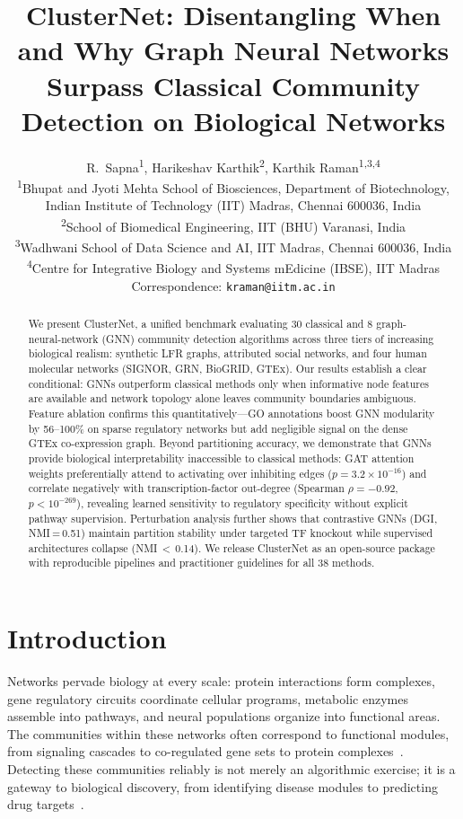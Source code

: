 \documentclass[11pt]{article}
\title{ClusterNet: Disentangling When and Why Graph Neural Networks\\
Surpass Classical Community Detection on Biological Networks}
\author{
  R.~Sapna\textsuperscript{1},
  Harikeshav Karthik\textsuperscript{2},
  Karthik Raman\textsuperscript{1,3,4}
  \\[6pt]
  \textsuperscript{1}Bhupat and Jyoti Mehta School of Biosciences, Department of Biotechnology,\\
  Indian Institute of Technology (IIT) Madras, Chennai 600036, India\\
  \textsuperscript{2}School of Biomedical Engineering, IIT (BHU) Varanasi, India\\
  \textsuperscript{3}Wadhwani School of Data Science and AI, IIT Madras, Chennai 600036, India\\
  \textsuperscript{4}Centre for Integrative Biology and Systems mEdicine (IBSE), IIT Madras\\[6pt]
  Correspondence: \texttt{kraman@iitm.ac.in}
}
\date{}
\begin{document}
\maketitle

\begin{abstract}
We present ClusterNet, a unified benchmark evaluating 30 classical and 8 graph-neural-network (GNN) community detection algorithms across three tiers of increasing biological realism: synthetic LFR graphs, attributed social networks, and four human molecular networks (SIGNOR, GRN, BioGRID, GTEx). Our results establish a clear conditional: GNNs outperform classical methods only when informative node features are available and network topology alone leaves community boundaries ambiguous. Feature ablation confirms this quantitatively---GO annotations boost GNN modularity by 56--100\% on sparse regulatory networks but add negligible signal on the dense GTEx co-expression graph. Beyond partitioning accuracy, we demonstrate that GNNs provide biological interpretability inaccessible to classical methods: GAT attention weights preferentially attend to activating over inhibiting edges ($p = 3.2 \times 10^{-16}$) and correlate negatively with transcription-factor out-degree (Spearman $\rho = -0.92$, $p < 10^{-269}$), revealing learned sensitivity to regulatory specificity without explicit pathway supervision. Perturbation analysis further shows that contrastive GNNs (DGI, NMI\,=\,0.51) maintain partition stability under targeted TF knockout while supervised architectures collapse (NMI\,$<$\,0.14). We release ClusterNet as an open-source package with reproducible pipelines and practitioner guidelines for all 38 methods.
\end{abstract}

\section{Introduction}
\label{sec:introduction}

Networks pervade biology at every scale: protein interactions form complexes, gene regulatory circuits coordinate cellular programs, metabolic enzymes assemble into pathways, and neural populations organize into functional areas.
The communities within these networks often correspond to functional modules, from signaling cascades to co-regulated gene sets to protein complexes~\citep{santo_fortunato_d0b5bf4d, choobdar_dream_2019}.
Detecting these communities reliably is not merely an algorithmic exercise; it is a gateway to biological discovery, from identifying disease modules to predicting drug targets~\citep{gergely_palla_c9fbd5c7, albert__aszl__barab_si_ebeab141}.
\end{document}
